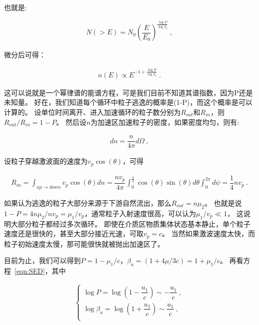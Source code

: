 也就是:

\begin{equation}
    \begin{aligned}
      N(>E)=N_{0}\left(\dfrac{E}{E_{0}}\right)^{\frac{\log P}{\log \beta_a}} \ ,
    \end{aligned}
\end{equation}

微分后可得：

\begin{equation}
  \label{eqn:SED}
    \begin{aligned}
      n(E) \propto E^{-1+\frac{\log P}{\log \beta_a}} \ .
    \end{aligned}
\end{equation}

这可以说就是一个幂律谱的能谱方程，可是我们目前不知道其谱指数，因为P还是未知量。
好在，我们知道每个循环中粒子逃逸的概率是(1-P)，而这个概率是可以计算的。
设单位时间离开、进入加速循环的粒子数分别为$R_{out}$和$R_{in}$，则
$R_{out}/R_{in}=1-P$。
然后设$n$为加速区加速粒子的密度，如果密度均匀，则有:

\begin{equation}
    \begin{aligned}
      dn=\dfrac{n}{4 \pi} d \Omega \ ,
    \end{aligned}
\end{equation}

设粒子穿越激波面的速度为$v_p\cos(\theta)$，可得

\begin{equation}
    \begin{aligned}
      R_{i n}=\int_{u p \rightarrow d o w n} v_p \cos (\theta) d n =
      \dfrac{n v_p}{4 \pi} \int_{0}^{\frac{\pi}{2}} \cos (\theta) \sin (\theta)
      d \theta \int_{0}^{2 \pi} d \psi=\dfrac{1}{4} n v_p \ .
    \end{aligned}
\end{equation}

如果认为逃逸的粒子大部分来源于下游自然流出，那么$R_{out}=n\mu_2$。
也就是说$1-P=4n\mu_2/nv_p=\mu_1/v_p$，通常粒子入射速度很高，可以认为$\mu_1/v_p \ll 1$，
这说明大部分粒子都经过多次循环。
即使在介质区物质集体状态基本静止，单个粒子速度还是很快的，甚至大部分接近光速，可取$v_p=c$。
当然如果激波速度太快，而粒子初始速度太慢，那可能很快就被抛出加速区了。

目前为止，我们可以得到$P=1-\mu_1/c$，$\beta_a=(1+4\mu/3c)=1+\mu_1/c$。
再看方程~\ref{eqn:SED}，其中

\begin{equation}
  \label{eqn:index}
    \begin{aligned}
        \begin{cases}
          \log P=\log \left(1-\dfrac{u_{1}}{c}\right) \sim-\dfrac{u_{1}}{c} \ , \\

          \log \beta_a=\log \left(1+\dfrac{u_{1}}{c}\right) \sim \dfrac{u_{1}}{c} \ , \\
        \end{cases}
    \end{aligned}
\end{equation}


